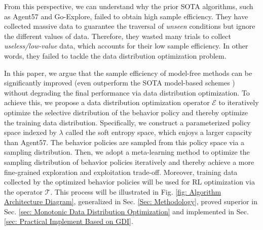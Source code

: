  From this perspective, we can understand why the prior SOTA algorithms, such as Agent57  and Go-Explore, failed  to obtain high sample efficiency. They have collected massive data to guarantee the traversal of \emph{unseen} conditions but ignore the different values of data. Therefore, they wasted many  trials to collect  \emph{useless/low-value} data, which accounts for their low sample efficiency. In other words, they failed to tackle the data distribution optimization problem.

In this paper, we argue that the sample efficiency of model-free methods can be significantly improved  (even outperform the SOTA model-based schemes \cite{dreamerv2}) without degrading the final performance  via data distribution optimization.   To achieve this, we propose a data distribution optimization operator $\mathcal{E}$ to iteratively optimize the selective distribution of the behavior policy  and  thereby optimize the training data distribution. Specifically, we  construct a parameterized  policy space indexed by $\lambda$ called the soft entropy space, which enjoys a larger capacity  than Agent57. The behavior policies are sampled  from this policy space via a sampling distribution. Then, we adopt a meta-learning method to  optimize the sampling distribution of behavior policies iteratively and thereby achieve a more fine-grained exploration and exploitation trade-off. Moreover, training data collected by the optimized behavior policies will be used for RL optimization via the operator $\mathcal{T}$. This process will be illustrated in Fig. \ref{fig: Algorithm Architecture Diagram}, generalized in Sec. \ref{Sec: Methodology}, proved  superior in Sec. \ref{sec: Monotonic Data Distribution Optimization} and implemented in Sec. \ref{sec: Practical Implement Based on GDI}.

